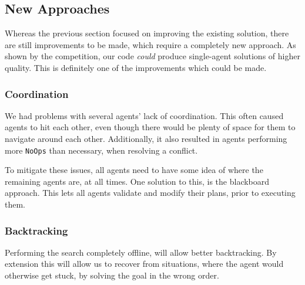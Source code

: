 \documentclass[letterpaper]{article}
\begin{document}
	\subsection{New Approaches}
		Whereas the previous section focused on improving the existing solution, there are still improvements to be made, which require a completely new approach. As shown by the competition, our code \emph{could} produce single-agent solutions of higher quality. This is definitely one of the improvements which could be made.


		\subsubsection{Coordination}
			We had problems with several agents' lack of coordination. This often caused agents to hit each other, even though there would be plenty of space for them to navigate around each other. Additionally, it also resulted in agents performing more \verb=NoOps= than necessary, when resolving a conflict.

			To mitigate these issues, all agents need to have some idea of where the remaining agents are, at all times. One solution to this, is the blackboard approach. This lets all agents validate and modify their plans, prior to executing them.


		\subsubsection{Backtracking}
		\label{subsub:backtrack}
			Performing the search completely offline, will allow better backtracking. By extension this will allow us to recover from situations, where the agent would otherwise get stuck, by solving the goal in the wrong order.
\end{document}
